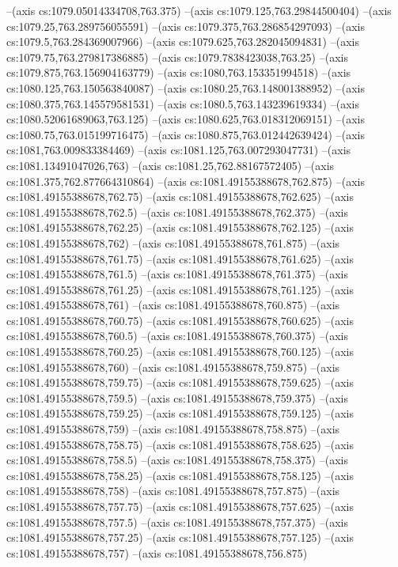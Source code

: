 --(axis cs:1079.05014334708,763.375)
--(axis cs:1079.125,763.29844500404)
--(axis cs:1079.25,763.289756055591)
--(axis cs:1079.375,763.286854297093)
--(axis cs:1079.5,763.284369007966)
--(axis cs:1079.625,763.282045094831)
--(axis cs:1079.75,763.279817386885)
--(axis cs:1079.7838423038,763.25)
--(axis cs:1079.875,763.156904163779)
--(axis cs:1080,763.153351994518)
--(axis cs:1080.125,763.150563840087)
--(axis cs:1080.25,763.148001388952)
--(axis cs:1080.375,763.145579581531)
--(axis cs:1080.5,763.143239619334)
--(axis cs:1080.52061689063,763.125)
--(axis cs:1080.625,763.018312069151)
--(axis cs:1080.75,763.015199716475)
--(axis cs:1080.875,763.012442639424)
--(axis cs:1081,763.009833384469)
--(axis cs:1081.125,763.007293047731)
--(axis cs:1081.13491047026,763)
--(axis cs:1081.25,762.88167572405)
--(axis cs:1081.375,762.877664310864)
--(axis cs:1081.49155388678,762.875)
--(axis cs:1081.49155388678,762.75)
--(axis cs:1081.49155388678,762.625)
--(axis cs:1081.49155388678,762.5)
--(axis cs:1081.49155388678,762.375)
--(axis cs:1081.49155388678,762.25)
--(axis cs:1081.49155388678,762.125)
--(axis cs:1081.49155388678,762)
--(axis cs:1081.49155388678,761.875)
--(axis cs:1081.49155388678,761.75)
--(axis cs:1081.49155388678,761.625)
--(axis cs:1081.49155388678,761.5)
--(axis cs:1081.49155388678,761.375)
--(axis cs:1081.49155388678,761.25)
--(axis cs:1081.49155388678,761.125)
--(axis cs:1081.49155388678,761)
--(axis cs:1081.49155388678,760.875)
--(axis cs:1081.49155388678,760.75)
--(axis cs:1081.49155388678,760.625)
--(axis cs:1081.49155388678,760.5)
--(axis cs:1081.49155388678,760.375)
--(axis cs:1081.49155388678,760.25)
--(axis cs:1081.49155388678,760.125)
--(axis cs:1081.49155388678,760)
--(axis cs:1081.49155388678,759.875)
--(axis cs:1081.49155388678,759.75)
--(axis cs:1081.49155388678,759.625)
--(axis cs:1081.49155388678,759.5)
--(axis cs:1081.49155388678,759.375)
--(axis cs:1081.49155388678,759.25)
--(axis cs:1081.49155388678,759.125)
--(axis cs:1081.49155388678,759)
--(axis cs:1081.49155388678,758.875)
--(axis cs:1081.49155388678,758.75)
--(axis cs:1081.49155388678,758.625)
--(axis cs:1081.49155388678,758.5)
--(axis cs:1081.49155388678,758.375)
--(axis cs:1081.49155388678,758.25)
--(axis cs:1081.49155388678,758.125)
--(axis cs:1081.49155388678,758)
--(axis cs:1081.49155388678,757.875)
--(axis cs:1081.49155388678,757.75)
--(axis cs:1081.49155388678,757.625)
--(axis cs:1081.49155388678,757.5)
--(axis cs:1081.49155388678,757.375)
--(axis cs:1081.49155388678,757.25)
--(axis cs:1081.49155388678,757.125)
--(axis cs:1081.49155388678,757)
--(axis cs:1081.49155388678,756.875)

